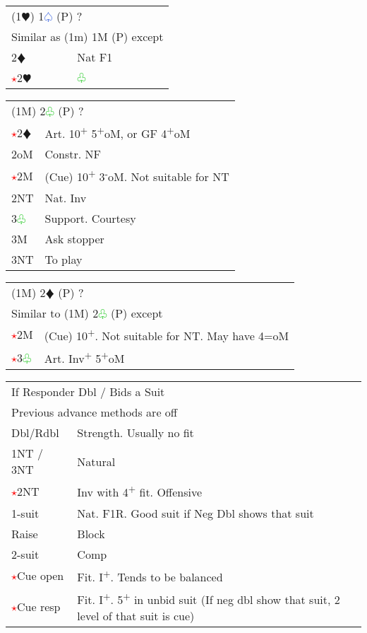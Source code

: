 \documentclass{article}
\renewcommand{\sp}{\textcolor{RoyalBlue}{$\varspade$}}
\newcommand{\he}{\textcolor{RubineRed}{$\varheart$}}
\newcommand{\di}{\textcolor{Peach}{$\vardiamond$}}
\newcommand{\cl}{\textcolor{LimeGreen}{$\varclub$}}
\newcommand{\nt}{\relsize{-1}NT\relsize{1}}
\newcommand{\up}{\textsuperscript{+}}
\newcommand{\down}{\textsuperscript{-}}
\newcommand{\al}{\textcolor{red}{$\star$}}
\begin{document}
\medskip

\begin{tabular}{|l|p{6.5cm}}
	\multicolumn{2}{l}{(1\he{}) 1\sp{} (P) ? } \\
	\multicolumn{2}{l}{Similar as (1m) 1M (P) except} \\
	2\di{} & Nat F1 \\
	\al{}2\he{} & \cl{} \\
\end{tabular}

\medskip

\begin{tabular}{|l|p{6.5cm}}
	\multicolumn{2}{l}{(1M) 2\cl{} (P) ? } \\
	\al{}2\di{} & Art. 10\up{} 5\up{}oM, or GF 4\up{}oM \\
	2oM & Constr. NF \\
	\al{}2M & (Cue) 10\up{} 3\down{}oM. Not suitable for \nt{} \\
	2\nt{} & Nat. Inv \\
	3\cl{} & Support. Courtesy \\
	3M & Ask stopper \\
	3\nt{} & To play
\end{tabular}

\medskip

\begin{tabular}{|l|p{6.5cm}}
	\multicolumn{2}{l}{(1M) 2\di{} (P) ? } \\
	\multicolumn{2}{l}{Similar to (1M) 2\cl{} (P) except} \\
	\al{}2M & (Cue) 10\up{}. Not suitable for \nt{}. May have 4=oM \\
	\al{}3\cl{} & Art. Inv\up{} 5\up{}oM \\
\end{tabular}

\medskip

\begin{tabular}{|l|p{6.5cm}}
	\multicolumn{2}{l}{If Responder Dbl / Bids a Suit} \\
	\multicolumn{2}{l}{Previous advance methods are off} \\
	Dbl/Rdbl & Strength. Usually no fit \\
	1\nt{} / 3\nt{} & Natural \\
	\al{}2\nt{} & Inv with 4\up{} fit. Offensive \\
	1-suit & Nat. F1R. Good suit if Neg Dbl shows that suit \\
	Raise & Block \\
	2-suit & Comp \\
	\al{}Cue open & Fit. I\up{}. Tends to be balanced \\
	\al{}Cue resp & Fit. I\up{}. 5\up{} in unbid suit (If neg dbl show that suit, 2 level of that suit is cue) \\
\end{tabular}
\end{document}
